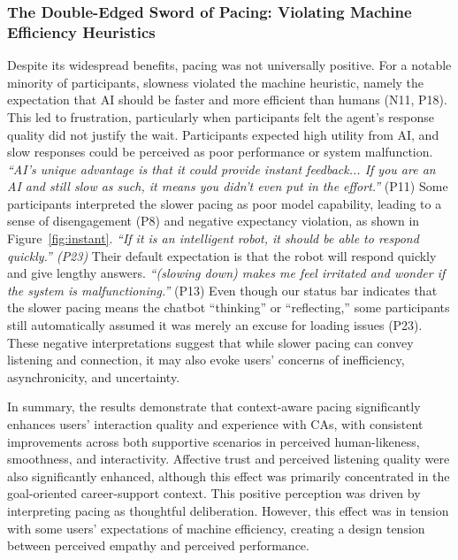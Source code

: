 \subsubsection{The Double-Edged Sword of Pacing: Violating Machine Efficiency Heuristics}
\label{subsubsec:doubleedged}
Despite its widespread benefits, pacing was not universally positive. For a notable minority of participants, slowness violated the machine heuristic, namely the expectation that AI should be faster and more efficient than humans \cite{10.1145/3290605.3300768} (N11, P18). This led to frustration, particularly when participants felt the agent's response quality did not justify the wait. Participants expected high utility from AI, and slow responses could be perceived as poor performance or system malfunction.
\textit{``AI's unique advantage is that it could provide instant feedback... If you are an AI and still slow as such, it means you didn't even put in the effort.'' }(P11)
Some participants interpreted the slower pacing as poor model capability, leading to a sense of disengagement (P8) and negative expectancy violation, as shown in Figure~\ref{fig:instant}. \textit{``If it is an intelligent robot, it should be able to respond quickly.'' (P23)} Their default expectation is that the robot will respond quickly and give lengthy answers. \textit{``(slowing down) makes me feel irritated and wonder if the system is malfunctioning.''} (P13) Even though our status bar indicates that the slower pacing means the chatbot ``thinking'' or ``reflecting,'' some participants still automatically assumed it was merely an excuse for loading issues (P23). These negative interpretations suggest that while slower pacing can convey listening and connection, it may also evoke users' concerns of inefficiency, asynchronicity, and uncertainty.

In summary, the results demonstrate that context-aware pacing significantly enhances users' interaction quality and experience with CAs, with consistent improvements across both supportive scenarios in perceived human-likeness, smoothness, and interactivity. Affective trust and perceived listening quality were also significantly enhanced, although this effect was primarily concentrated in the goal-oriented career-support context. This positive perception was driven by interpreting pacing as thoughtful deliberation. However, this effect was in tension with some users' expectations of machine efficiency, creating a design tension between perceived empathy and perceived performance.


